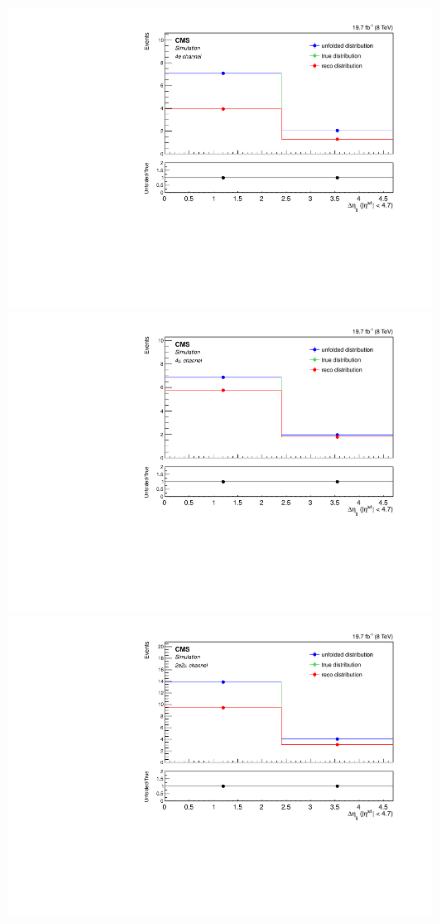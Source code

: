 \begin{figure}[hbtp]
  \begin{center}
    \includegraphics[width=0.8\cmsFigWidth]{Figures/Unfolding/MCTests/Deta_ZZTo4e_MadMatrix_MadDistr_FullSample_fr}     
    \includegraphics[width=0.8\cmsFigWidth]{Figures/Unfolding/MCTests/Deta_ZZTo4m_MadMatrix_MadDistr_FullSample_fr}     
    \includegraphics[width=0.8\cmsFigWidth]{Figures/Unfolding/MCTests/Deta_ZZTo2e2m_MadMatrix_MadDistr_FullSample_fr}

\end{center}
\end{figure}
